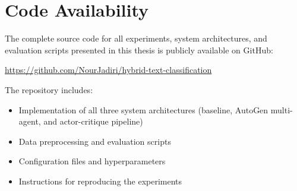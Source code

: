 \chapter*{Code Availability}

The complete source code for all experiments, system architectures, and evaluation scripts presented in this thesis is publicly available on GitHub:

\begin{center}
\url{https://github.com/NourJadiri/hybrid-text-classification}
\end{center}

The repository includes:
\begin{itemize}
    \item Implementation of all three system architectures (baseline, AutoGen multi-agent, and actor-critique pipeline)
    \item Data preprocessing and evaluation scripts
    \item Configuration files and hyperparameters
    \item Instructions for reproducing the experiments
\end{itemize}
